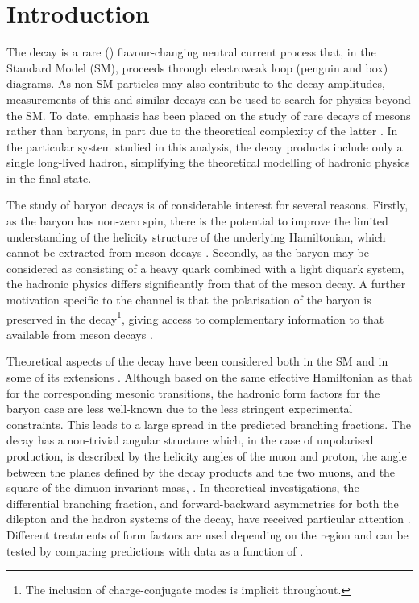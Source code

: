 \section{Introduction}
The decay \decay{\Lb}{\Lz\mumu} is a rare (\decay{\bquark}{\squark})
flavour-changing neutral current process that, in the Standard Model
(SM), proceeds through electroweak loop (penguin and \Wpm box)
diagrams.  As non-SM particles may also contribute to the decay
amplitudes, measurements of this and similar decays can be used to
search for physics beyond the SM. To date, emphasis has been placed on
the study of rare decays of mesons rather than baryons, in part due to
the theoretical complexity of the latter \cite{Mannel:1997xy}.  In the
particular system studied in this analysis, the decay products include
only a single long-lived hadron, simplifying the theoretical modelling
of hadronic physics in the final state.

The study of \Lb baryon decays is of considerable interest for several
reasons.  Firstly, as the \Lb baryon {has non-zero spin}, there is the
potential to improve the limited understanding of the helicity
structure of the underlying Hamiltonian, which cannot be extracted
from meson decays \cite{Hiller:2007ur,Mannel:1997xy}. Secondly, as the
\Lb baryon may be considered as consisting of a heavy quark combined
with a light diquark system, the hadronic physics differs
significantly from that of the \B meson decay.  A further motivation
specific to the \decay{\Lb}{\Lz\mumu} channel is that the polarisation
of the \Lz baryon is preserved in the \decay{\Lz}{\proton\pim}
decay\footnote{The inclusion of charge-conjugate modes is implicit
  throughout.}, giving access to complementary information to that
available from meson decays \cite{Boer:2014kda}.

Theoretical aspects of the \decay{\Lb}{\Lz\mumu} decay have been
considered both in the SM and in some of its extensions
\cite{Boer:2014kda,Aslam:2008hp,Wang:2008sm,Huang:1998ek,Chen:2001ki,Chen:2001zc,
  Chen:2001sj,Zolfagharpour:2007eh,Mott:2011cx,Aliev:2010uy,Mohanta:2010eb,Sahoo:2011yb,Detmold:2012vy,Gutsche:2013pp}.
Although based on the same effective Hamiltonian as that for the
corresponding mesonic transitions, the hadronic form factors for the
\Lb baryon case are less well-known due to the less stringent
experimental constraints.  This leads to a large spread in the
predicted branching fractions.  The decay has a non-trivial angular
structure which, in the case of unpolarised \Lb production, is
described by the helicity angles of the muon and proton, the angle
between the planes defined by the \Lz decay products and the two
muons, and the square of the dimuon invariant mass, \qsq.  In
theoretical investigations, the differential branching fraction, and
forward-backward asymmetries for both the dilepton and the hadron
systems of the decay, have received particular attention
\cite{Boer:2014kda,Mott:2011cx,Detmold:2012vy,Meinel:2014wua,Gutsche:2013pp}.
Different treatments of form factors are used depending on the \qsq
region and can be tested by comparing predictions with data as a
function of \qsq.
 
